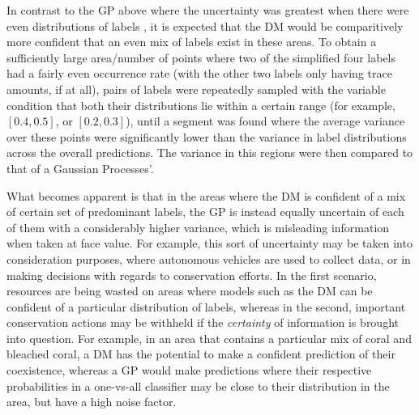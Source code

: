 
In contrast to the GP above where the uncertainty was greatest when there were even distributions of labels , it is expected that the DM would be comparitively more confident that an even mix of labels exist in these areas. To obtain a sufficiently large area/number of points where two of the simplified four labels had a fairly even occurrence rate (with the other two labels only having trace amounts, if at all), pairs of labels were repeatedly sampled with the variable condition that both their distributions lie within a certain range (for example, $[0.4, 0.5]$, or $[0.2, 0.3]$), until a segment was found where the average variance over these points were significantly lower than the variance in label distributions across the overall predictions. The variance in this regions were then compared to that of a Gaussian Processes'.

What becomes apparent is that in the areas where the DM is confident of a mix of certain set of predominant labels, the GP is instead equally uncertain of each of them with a considerably higher variance, which is misleading information when taken at face value. For example, this sort of uncertainty may be taken into consideration purposes, where autonomous vehicles are used to collect data, or in making decisions with regards to conservation efforts. In the first scenario, resources are being wasted on areas where models such as the DM can be confident of a particular distribution of labels, whereas in the second, important conservation actions may be withheld if the \textit{certainty} of information is brought into question. For example, in an area that contains a particular mix of coral and bleached coral, a DM has the potential to make a confident prediction of their coexistence, whereas a GP would make predictions where their respective probabilities in a one-vs-all classifier may be close to their distribution in the area, but have a high noise factor.

